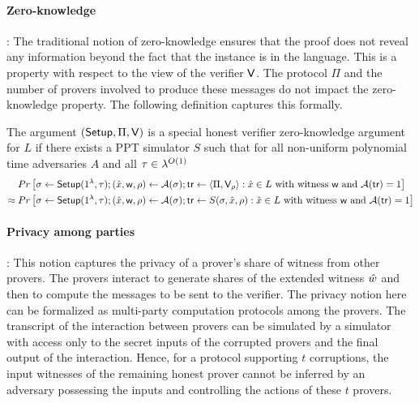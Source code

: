 \paragraph{Zero-knowledge}: 
The traditional notion of zero-knowledge ensures that the proof does not reveal any information beyond the fact that the instance is in the language.
This is a property with respect to the view of the verifier $\mathsf{V}$. The protocol $\Pi$ and the number of provers involved to produce these messages do not impact the zero-knowledge property. The following definition captures this formally.
\begin{definition}
The argument $(\mathsf{Setup}, \Pi, \mathsf{V})$ is a special honest verifier zero-knowledge argument for $L$ if there exists a PPT simulator $S$ such that for all non-uniform polynomial time adversaries $A$ and all $\tau \in {\lambda}^{O(1)}$ 
\begin{align*}
&Pr \left[ \sigma \leftarrow \mathsf{Setup}(1^{\lambda}, \tau); (\hat{x} ,\mathsf{w} ,\rho) \leftarrow \mathcal{A}(\sigma); \mathsf{tr} \leftarrow \langle \Pi, \mathsf{V}_\rho \rangle: \hat{x} \in L \text{ with witness } \mathsf{w} \text{ and } \mathcal{A}(\mathsf{tr})=1 \right] \\
\approx \; &Pr \left[\sigma \leftarrow \mathsf{Setup}(1^{\lambda}, \tau); (\hat{x},\mathsf{w},\rho) \leftarrow \mathcal{A}(\sigma); \mathsf{tr} \leftarrow S(\sigma,\hat{x},\rho): \hat{x} \in L \text{ with witness } \mathsf{w} \text{ and } \mathcal{A}(\mathsf{tr}) = 1 \right]
\end{align*}
\end{definition}

\paragraph{Privacy among parties}:
This notion captures the privacy of a prover's share of witness from other provers. The provers interact to generate shares of the extended witness $\hat{w}$ and then to compute the messages to be sent to the verifier. The privacy notion here can be formalized as multi-party computation protocols among the provers. The transcript of the interaction between provers can be simulated by a simulator with access only to the secret inputs of the corrupted provers and the final output of the interaction. Hence, for a protocol supporting $t$ corruptions, the input witnesses of the remaining honest prover cannot be inferred by an adversary possessing the inputs and controlling the actions of these $t$ provers.

